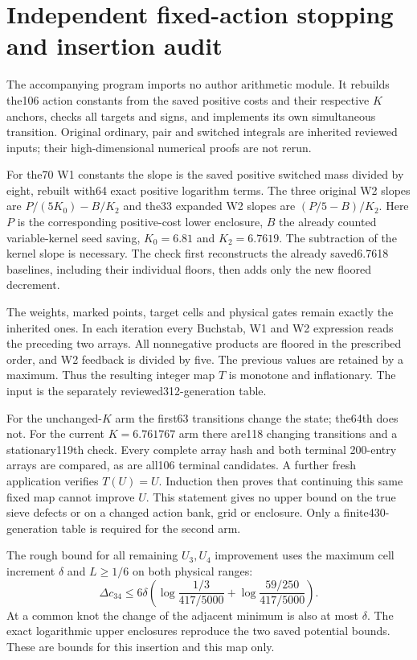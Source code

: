\section*{Independent fixed-action stopping and insertion audit}
The accompanying program imports no author arithmetic module. It rebuilds
the106 action constants from the saved positive costs and their respective
$K$ anchors, checks all targets and signs, and implements its own simultaneous
transition. Original ordinary, pair and switched integrals are inherited
reviewed inputs; their high-dimensional numerical proofs are not rerun.

For the70 W1 constants the slope is the saved positive switched mass divided
by eight, rebuilt with64 exact positive logarithm terms. The three original
W2 slopes are $P/(5K_0)-B/K_2$ and the33 expanded W2 slopes are
$(P/5-B)/K_2$. Here $P$ is the corresponding positive-cost lower enclosure,
$B$ the already counted variable-kernel seed saving, $K_0=6.81$ and
$K_2=6.7619$. The subtraction of the kernel slope is necessary. The check
first reconstructs the already saved6.7618 baselines, including their
individual floors, then adds only the new floored decrement.

The weights, marked points, target cells and physical gates remain exactly
the inherited ones. In each iteration every Buchstab, W1 and W2 expression
reads the preceding two arrays. All nonnegative products are floored in the
prescribed order, and W2 feedback is divided by five. The previous values
are retained by a maximum. Thus the resulting integer map $T$ is monotone
and inflationary. The input is the separately reviewed312-generation table.

For the unchanged-$K$ arm the first63 transitions change the state; the64th
does not. For the current $K=6.761767$ arm there are118 changing transitions
and a stationary119th check. Every complete array hash and both terminal
200-entry arrays are compared, as are all106 terminal candidates. A further
fresh application verifies $T(U)=U$. Induction then proves that continuing
this same fixed map cannot improve $U$. This statement gives no upper bound
on the true sieve defects or on a changed action bank, grid or enclosure.
Only a finite430-generation table is required for the second arm.

The rough bound for all remaining $U_3,U_4$ improvement uses the maximum
cell increment $\delta$ and $L\ge1/6$ on both physical ranges:
\[
 \Delta c_{34}\le6\delta
 \left(\log\frac{1/3}{417/5000}+\log\frac{59/250}{417/5000}\right).
\]
At a common knot the change of the adjacent minimum is also at most
$\delta$. The exact logarithmic upper enclosures reproduce the two saved
potential bounds. These are bounds for this insertion and this map only.

